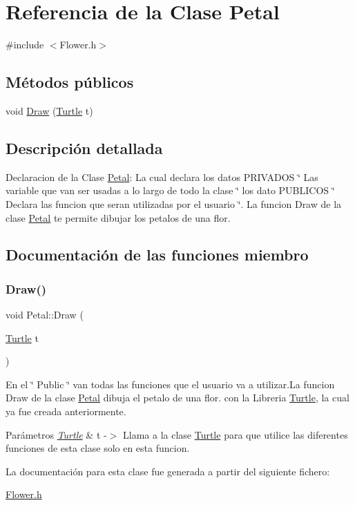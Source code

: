 \hypertarget{class_petal}{}\section{Referencia de la Clase Petal}
\label{class_petal}


{\ttfamily \#include $<$Flower.\+h$>$}

\subsection*{Métodos públicos}
\begin{DoxyCompactItemize}
\item 
void \mbox{\hyperlink{class_petal_a7bf41ed6e5d646ffa0e08691d37bd1ed}{Draw}} (\mbox{\hyperlink{class_turtle}{Turtle}} t)
\end{DoxyCompactItemize}


\subsection{Descripción detallada}
Declaracion de la Clase \mbox{\hyperlink{class_petal}{Petal}}\+: La cual declara los datos P\+R\+I\+V\+A\+D\+OS \char`\"{} Las variable que van ser usadas a lo largo de todo la clase \char`\"{} los dato P\+U\+B\+L\+I\+C\+OS \char`\"{} Declara las funcion que seran utilizadas por el usuario \char`\"{}. La funcion Draw de la clase \mbox{\hyperlink{class_petal}{Petal}} te permite dibujar los petalos de una flor. 

\subsection{Documentación de las funciones miembro}
\mbox{\label{class_petal_a7bf41ed6e5d646ffa0e08691d37bd1ed}} 
\subsubsection{\texorpdfstring{Draw()}{Draw()}}
{\footnotesize\ttfamily void Petal\+::\+Draw (\begin{DoxyParamCaption}\item[{\mbox{\hyperlink{class_turtle}{Turtle}}}]{t }\end{DoxyParamCaption})\hspace{0.3cm}{\ttfamily [inline]}}

En el \char`\"{} Public \char`\"{} van todas las funciones que el usuario va a utilizar.\+La funcion Draw de la clase \mbox{\hyperlink{class_petal}{Petal}} dibuja el petalo de una flor. con la Libreria \mbox{\hyperlink{class_turtle}{Turtle}}, la cual ya fue creada anteriormente.
\begin{DoxyParams}{Parámetros}
{\em \mbox{\hyperlink{class_turtle}{Turtle}}} & t -\/$>$ Llama a la clase \mbox{\hyperlink{class_turtle}{Turtle}} para que utilice las diferentes funciones de esta clase solo en esta funcion. \\
\hline
\end{DoxyParams}


La documentación para esta clase fue generada a partir del siguiente fichero\+:\begin{DoxyCompactItemize}
\item 
\mbox{\hyperlink{_flower_8h}{Flower.\+h}}\end{DoxyCompactItemize}

